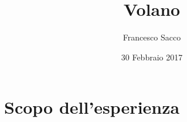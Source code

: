 \documentclass{exam}
\date{30 Febbraio 2017}
\author{Francesco Sacco}
\title{Volano}
\begin{document}
	\maketitle
	\section{Scopo dell'esperienza}
	
\end{document}

